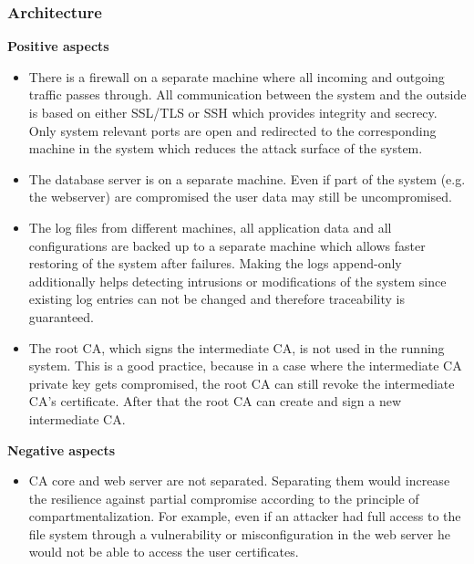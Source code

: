 \documentclass[english]{article}
\begin{document}
\subsubsection{Architecture}
\textbf{Positive aspects}
\begin{itemize}
\item There is a firewall on a separate machine where all incoming and outgoing traffic passes through. All communication between the system and the outside is based on either SSL/TLS or SSH which provides integrity and secrecy. Only system relevant ports are open and redirected to the corresponding machine in the system which reduces the attack surface of the system.
\item The database server is on a separate machine. Even if part of the system (e.g. the webserver) are compromised the user data may still be uncompromised.
\item The log files from different machines, all application data and all configurations are backed up to a separate machine which allows faster restoring of the system after failures. Making the logs append-only additionally helps detecting intrusions or modifications of the system since existing log entries can not be changed and therefore traceability is guaranteed. 

\item The root CA, which signs the intermediate CA, is not used in the running system. This is a good practice, because in a case where the intermediate CA private key gets compromised, the root CA can still revoke the intermediate CA's certificate. After that the root CA can create and sign a new intermediate CA.
  
\end{itemize}

\textbf{Negative aspects}
\begin{itemize}
\item CA core and web server are not separated. Separating them would increase the resilience against partial compromise according to the principle of compartmentalization. For example, even if an attacker had full access to the file system through a vulnerability or misconfiguration in the web server he would not be able to access the user certificates.
\end{itemize}
\end{document}
